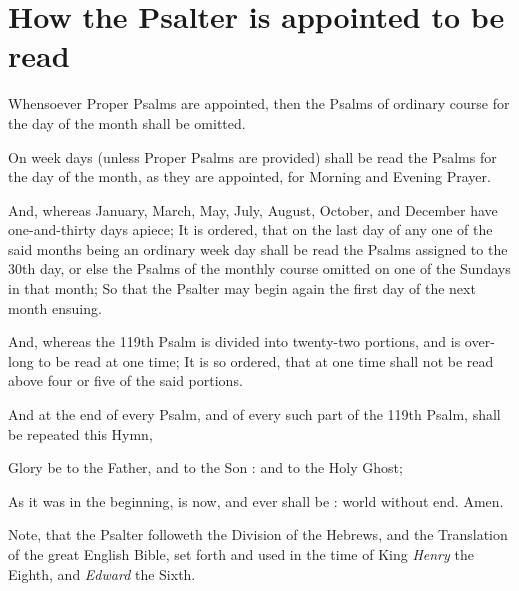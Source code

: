 \section{How the Psalter is appointed to be read}

{\scriptsize

Whensoever Proper Psalms are appointed, then the Psalms of
ordinary course for the day of the month shall be omitted.

On week days (unless Proper Psalms are provided) shall be read the
Psalms for the day of the month, as they are appointed, for
Morning and Evening Prayer.

And, whereas January, March, May, July, August, October, and
December have one-and-thirty days apiece; It is ordered, that on
the last day of any one of the said months being an ordinary week
day shall be read the Psalms assigned to the 30th day, or else
the Psalms of the monthly course omitted on one of the Sundays in
that month; So that the Psalter may begin again the first day of
the next month ensuing.

And, whereas the 119th Psalm is divided into twenty-two portions,
and is over-long to be read at one time; It is so ordered, that
at one time shall not be read above four or five of the said
portions.

And at the end of every Psalm, and of every such part of the
119th Psalm, shall be repeated this Hymn,


{\normalsize
Glory be to the Father, and to the Son : and to the Holy Ghost;

As it was in the beginning, is now, and ever shall be : world without end. Amen.
}


Note, that the Psalter followeth the Division of the Hebrews, and
the Translation of the great English Bible, set forth and used in
the time of King \emph{Henry} the Eighth, and \emph{Edward} the Sixth.


}
\medskip
